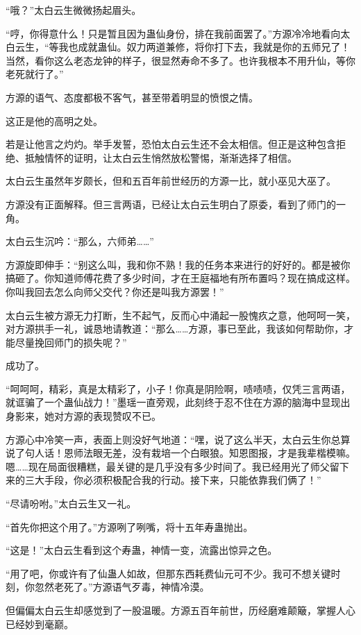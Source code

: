 \begin{this_body}
“哦？”太白云生微微扬起眉头。

“哼，你得意什么！只是暂且因为蛊仙身份，排在我前面罢了。”方源冷冷地看向太白云生，“等我也成就蛊仙。奴力两道兼修，将你打下去，我就是你的五师兄了！当然，看你这么老态龙钟的样子，很显然寿命不多了。也许我根本不用升仙，等你老死就行了。”

方源的语气、态度都极不客气，甚至带着明显的愤恨之情。

这正是他的高明之处。

若是让他言之灼灼。举手发誓，恐怕太白云生还不会太相信。但正是这种包含拒绝、抵触情怀的证明，让太白云生悄然放松警惕，渐渐选择了相信。

太白云生虽然年岁颇长，但和五百年前世经历的方源一比，就小巫见大巫了。

方源没有正面解释。但三言两语，已经让太白云生明白了原委，看到了师门的一角。

太白云生沉吟：“那么，六师弟……”

方源旋即伸手：“别这么叫，我和你不熟！我的任务本来进行的好好的。都是被你搞砸了。你知道师傅花费了多少时间，才在王庭福地有所布置吗？现在搞成这样。你叫我回去怎么向师父交代？你还是叫我方源罢！”

太白云生被方源无力打断，生不起气，反而心中涌起一股愧疚之意，他呵呵一笑，对方源拱手一礼，诚恳地请教道：“那么……方源，事已至此，我该如何帮助你，才能尽量挽回师门的损失呢？”

成功了。

“呵呵呵，精彩，真是太精彩了，小子！你真是阴险啊，啧啧啧，仅凭三言两语，就诓骗了一个蛊仙战力！”墨瑶一直旁观，此刻终于忍不住在方源的脑海中显现出身影来，她对方源的表现赞叹不已。

方源心中冷笑一声，表面上则没好气地道：“嘿，说了这么半天，太白云生你总算说了句人话！恩师法眼无差，没有栽培一个白眼狼。知恩图报，才是我辈楷模嘛。嗯……现在局面很糟糕，最关键的是几乎没有多少时间了。我已经用光了师父留下来的三大手段，你必须积极配合我的行动。接下来，只能依靠我们俩了！”

“尽请吩咐。”太白云生又一礼。

“首先你把这个用了。”方源咧了咧嘴，将十五年寿蛊抛出。

“这是！”太白云生看到这个寿蛊，神情一变，流露出惊异之色。

“用了吧，你或许有了仙蛊人如故，但那东西耗费仙元可不少。我可不想关键时刻，你忽然老死了。”方源语气歹毒，神情冷漠。

但偏偏太白云生却感觉到了一股温暖。方源五百年前世，历经磨难颠簸，掌握人心已经妙到毫巅。


\end{this_body}
